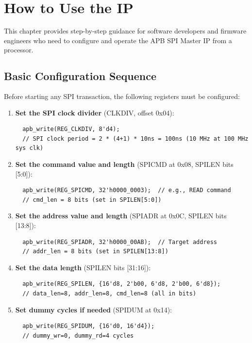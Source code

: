 \chapter{How to Use the IP}
\label{ch:howto}

This chapter provides step-by-step guidance for software developers and firmware engineers who need
to configure and operate the APB SPI Master IP from a processor.

\section{Basic Configuration Sequence}

Before starting any SPI transaction, the following registers must be configured:

\begin{enumerate}[leftmargin=2em]
  \item \textbf{Set the SPI clock divider} (CLKDIV, offset 0x04):
  \begin{lstlisting}
  apb_write(REG_CLKDIV, 8'd4);
  // SPI clock period = 2 * (4+1) * 10ns = 100ns (10 MHz at 100 MHz sys clk)
  \end{lstlisting}

  \item \textbf{Set the command value and length} (SPICMD at 0x08, SPILEN bits [5:0]):
  \begin{lstlisting}
  apb_write(REG_SPICMD, 32'h0000_0003);  // e.g., READ command
  // cmd_len = 8 bits (set in SPILEN[5:0])
  \end{lstlisting}

  \item \textbf{Set the address value and length} (SPIADR at 0x0C, SPILEN bits [13:8]):
  \begin{lstlisting}
  apb_write(REG_SPIADR, 32'h0000_00AB);  // Target address
  // addr_len = 8 bits (set in SPILEN[13:8])
  \end{lstlisting}

  \item \textbf{Set the data length} (SPILEN bits [31:16]):
  \begin{lstlisting}
  apb_write(REG_SPILEN, {16'd8, 2'b00, 6'd8, 2'b00, 6'd8});
  // data_len=8, addr_len=8, cmd_len=8 (all in bits)
  \end{lstlisting}

  \item \textbf{Set dummy cycles if needed} (SPIDUM at 0x14):
  \begin{lstlisting}
  apb_write(REG_SPIDUM, {16'd0, 16'd4});
  // dummy_wr=0, dummy_rd=4 cycles
  \end{lstlisting}
\end{enumerate}

